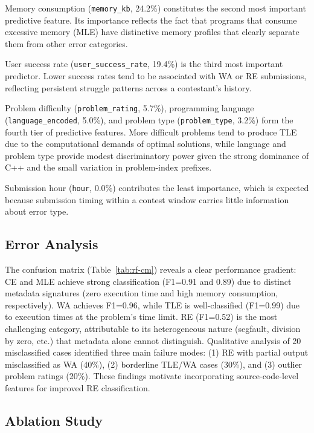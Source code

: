 \documentclass[10pt,a4paper]{article}
\begin{document}
Memory consumption (\texttt{memory\_kb}, 24.2\%) constitutes the second most
important predictive feature. Its importance reflects the fact that programs
that consume excessive memory (MLE) have distinctive memory profiles that
clearly separate them from other error categories.

User success rate (\texttt{user\_success\_rate}, 19.4\%) is the third most
important predictor. Lower success rates tend to be associated with WA or RE
submissions, reflecting persistent struggle patterns across a contestant's
history.

Problem difficulty (\texttt{problem\_rating}, 5.7\%), programming language
(\texttt{language\_encoded}, 5.0\%), and problem type (\texttt{problem\_type},
3.2\%) form the fourth tier of predictive features. More difficult problems
tend to produce TLE due to the computational demands of optimal
solutions, while language and problem type provide modest discriminatory power
given the strong dominance of C++ and the small variation in problem-index
prefixes.

Submission hour (\texttt{hour}, 0.0\%) contributes the least importance, which
is expected because submission timing within a contest window carries little
information about error type.

\subsection{Error Analysis}

The confusion matrix (Table~\ref{tab:rf-cm}) reveals a clear performance
gradient: CE and MLE achieve strong classification (F1=0.91 and 0.89) due to
distinct metadata signatures (zero execution time and high memory consumption,
respectively). WA achieves F1=0.96, while TLE is well-classified (F1=0.99)
due to execution times at the problem's time limit. RE (F1=0.52) is the most
challenging category, attributable to its heterogeneous nature (segfault,
division by zero, etc.) that metadata alone cannot distinguish. Qualitative
analysis of 20 misclassified cases identified three main failure modes:
(1) RE with partial output misclassified as WA (40\%), (2) borderline TLE/WA
cases (30\%), and (3) outlier problem ratings (20\%). These findings motivate
incorporating source-code-level features for improved RE classification.

\subsection{Ablation Study}
\label{sec:ablation}
\end{document}
